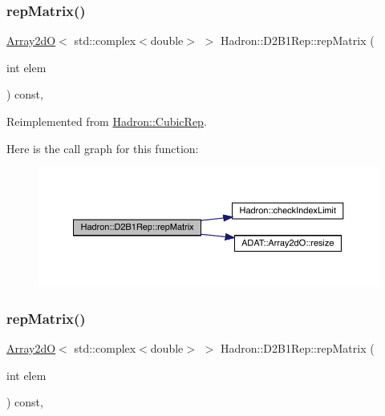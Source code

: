\subsubsection{\texorpdfstring{repMatrix()}{repMatrix()}\hspace{0.1cm}{\footnotesize\ttfamily [1/3]}}
{\footnotesize\ttfamily \mbox{\hyperlink{classADAT_1_1Array2dO}{Array2dO}}$<$ std\+::complex$<$double$>$ $>$ Hadron\+::\+D2\+B1\+Rep\+::rep\+Matrix (\begin{DoxyParamCaption}\item[{int}]{elem }\end{DoxyParamCaption}) const\hspace{0.3cm}{\ttfamily [inline]}, {\ttfamily [virtual]}}



Reimplemented from \mbox{\hyperlink{structHadron_1_1CubicRep_ac5d7e9e6f4ab1158b5fce3e4ad9e8005}{Hadron\+::\+Cubic\+Rep}}.

Here is the call graph for this function\+:
\nopagebreak
\begin{figure}[H]
\begin{center}
\leavevmode
\includegraphics[width=350pt]{d1/d67/structHadron_1_1D2B1Rep_a3d7f68800d29238030406bf06553360f_cgraph}
\end{center}
\end{figure}
\mbox{\label{structHadron_1_1D2B1Rep_a3d7f68800d29238030406bf06553360f}} 
\subsubsection{\texorpdfstring{repMatrix()}{repMatrix()}\hspace{0.1cm}{\footnotesize\ttfamily [2/3]}}
{\footnotesize\ttfamily \mbox{\hyperlink{classADAT_1_1Array2dO}{Array2dO}}$<$ std\+::complex$<$double$>$ $>$ Hadron\+::\+D2\+B1\+Rep\+::rep\+Matrix (\begin{DoxyParamCaption}\item[{int}]{elem }\end{DoxyParamCaption}) const\hspace{0.3cm}{\ttfamily [inline]}, {\ttfamily [virtual]}}



